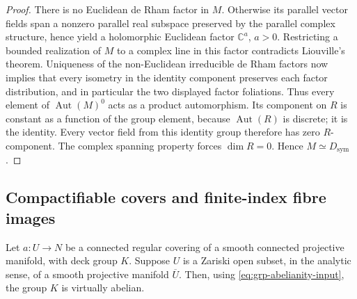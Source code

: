 \begin{proof}
There is no Euclidean de Rham factor in $M$.  Otherwise its parallel vector fields span a nonzero parallel real subspace preserved by the parallel complex structure, hence yield a holomorphic Euclidean factor $\mathbb{C}^a$, $a>0$.  Restricting a bounded realization of $M$ to a complex line in this factor contradicts Liouville's theorem.  Uniqueness of the non-Euclidean irreducible de Rham factors \cite[\S7, Th\'eor\`eme~III]{DeRham1952} now implies that every isometry in the identity component preserves each factor distribution, and in particular the two displayed factor foliations.  Thus every element of $\operatorname{Aut}(M)^0$ acts as a product automorphism. Its component on $R$ is constant as a function of the group element, because $\operatorname{Aut}(R)$ is discrete; it is the identity. Every vector field from this identity group therefore has zero $R$-component.  The complex spanning property forces $\dim R=0$. Hence $M\simeq D_{\mathrm{sym}}$.
\end{proof}

\subsection{Compactifiable covers and finite-index fibre images}

\begin{lemma}\label{lem:grp-compactifiable-cover}
Let $a:U\to N$ be a connected regular covering of a smooth connected projective manifold, with deck group $K$.  Suppose $U$ is a Zariski open subset, in the analytic sense, of a smooth projective manifold $\overline U$. Then, using \eqref{eq:grp-abelianity-input}, the group $K$ is virtually abelian.
\end{lemma}

